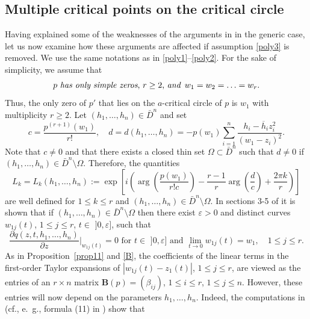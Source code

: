 \documentclass[10pt,twoside,a4paper,reqno]{amsart}
\theoremstyle{plain}
\theoremstyle{definition}
\begin{document}
{\subsection{Multiple critical points on the critical circle}

Having explained some of the weaknesses of the arguments in \cite[v1-v2]{S1} 
in the generic case, let us now examine how these arguments are affected if 
assumption \eqref{poly3} is 
removed. We use the same notations as in \eqref{poly1}--\eqref{poly2}. 
For the sake of simplicity, we assume that 
\begin{equation}\label{nongen}
\text{$p$ {\em has only simple zeros}, $r\ge 2$, {\em and} }\,w_{1}=w_{2}=
\ldots=w_{r}.
\end{equation}
Thus, the only zero of $p'$ that lies on the $a$-critical circle of $p$ is 
$w_{1}$ with multiplicity $r\ge 2$. Let $(h_{1},\ldots,h_{n})\in \bar{D}^n$ 
and set
\begin{equation}\label{nongen1}
c=\frac{p^{(r+1)}(w_{1})}{r!},\quad d=d(h_{1},\ldots,h_{n})=-p(w_{1})
\sum_{i=1}^{n}\frac{h_{i}-\overline{h}_{i}z_{i}^2}{(w_{1}-z_{i})^2}.
\end{equation}
Note that $c\neq 0$ and that there exists a closed thin set $\Omega\subset 
\bar{D}^n$ such that $d\neq 0$ if $(h_{1},\ldots,h_{n})\in 
\bar{D}^n\setminus \Omega$. Therefore, the quantities
\begin{equation}\label{nongen2}
L_{k}=L_{k}(h_{1},\ldots,h_{n}):=\exp\!\left[i\left(\!\arg\!\left(\!
\frac{p(w_{1})}{r!c}\!\right)-\frac{r-1}{r}\arg\!\left(\frac{d}{c}\right)+
\frac{2\pi k}{r}\!\right)\right]
\end{equation}
are well defined for $1\le k\le r$ and $(h_{1},\ldots,h_{n})\in \bar{D}^n
\setminus \Omega$. In sections 3-5 of \cite[v1-v2]{S1} it is shown that if 
$(h_{1},\ldots,h_{n})\in \bar{D}^n\setminus \Omega$ then there exist 
$\varepsilon>0$ and distinct curves $w_{1j}(t)$, $1\le j\le r$, 
$t\in \,\,]0,\varepsilon]$, such that
$$\frac{\partial q(z,t,h_{1},\ldots,h_{n})}{\partial z}\!\bigg|_{w_{1j}(t)}=
0\text{ for }t\in \,\,]0,\varepsilon]\text{ and }\!
\lim_{t\rightarrow 0}w_{1j}(t)=w_{1},
\quad 1\le j\le r.$$
As in Proposition~\ref{prop11} and \eqref{B}, the coefficients of the linear 
terms in the first-order Taylor expansions of $|w_{1j}(t)-z_{1}(t)|$, 
$1\le j\le r$, are viewed as the 
entries of an 
$r\times n$ matrix $\mathbf{B}(p)=(\beta_{ij})$, $1\le i\le r$, 
$1\le j\le n$. However, these entries will now depend on the  parameters 
$h_{1},\ldots,h_{n}$. Indeed, the computations in \cite[v1-v2]{S1} 
(cf., e.~g., formula (11) in \cite[v1-v2]{S1}) show that 

}
\end{document}
